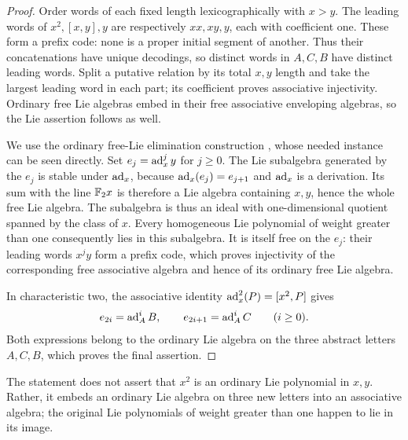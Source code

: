 \begin{proof}
Order words of each fixed length lexicographically with $x>y$.
The leading words of $x^2,[x,y],y$ are respectively $xx,xy,y$, each with
coefficient one.  These form a prefix code: none is a proper initial
segment of another.  Thus their concatenations have unique decodings,
so distinct words in $A,C,B$ have distinct leading words.  Split a
putative relation by its total $x,y$ length and take the largest
leading word in each part; its coefficient proves associative
injectivity.  Ordinary free Lie algebras embed in their free associative
enveloping algebras, so the Lie assertion follows as well.

We use the ordinary free-Lie elimination construction
\cite[Theorem~0.6]{Reutenauer}, whose needed instance can be seen directly.
Set $e_j=\operatorname{ad}_x^j y$ for $j\geq0$.  The Lie subalgebra generated by the
$e_j$ is stable under $\operatorname{ad}_x$, because $\operatorname{ad}_x(e_j)=e_{j+1}$ and
$\operatorname{ad}_x$ is a derivation.  Its sum with the line ${\mathbb F_2} x$ is therefore a
Lie algebra containing $x,y$, hence the whole free Lie algebra.  The
subalgebra is thus an ideal with one-dimensional quotient spanned by
the class of $x$.  Every homogeneous Lie polynomial of weight greater
than one consequently lies in this subalgebra.  It is itself free on
the $e_j$: their leading words $x^j y$ form a prefix code, which proves
injectivity of the corresponding free associative algebra and hence
of its ordinary free Lie algebra.

In characteristic two, the associative identity
$\operatorname{ad}_x^2(P)=[x^2,P]$ gives
\begin{equation}\label{eq:elimination-abc}
 e_{2i}=\operatorname{ad}_A^i B,\qquad e_{2i+1}=\operatorname{ad}_A^i C\qquad(i\geq0).
\end{equation}
Both expressions belong to the ordinary Lie algebra on the three
abstract letters $A,C,B$, which proves the final assertion.
\end{proof}

The statement does not assert that $x^2$ is an ordinary Lie polynomial
in $x,y$.  Rather, it embeds an ordinary Lie algebra on three new
letters into an associative algebra; the original Lie polynomials of
weight greater than one happen to lie in its image.

